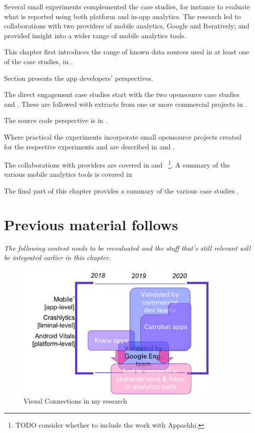Several small experiments complemented the case studies, for instance to evaluate what is reported using both platform and in-app analytics. 
The research led to collaborations with two providers of mobile analytics, Google and Iteratively; and provided insight into a wider range of mobile analytics tools.


This chapter first introduces the range of known data sources used in at least one of the case studies, in . 

Section  presents the app developers' perspectives. 

The direct engagement case studies start with the two opensource case studies  and . These are followed with extracts from one or more commercial projects in . 

The source code perspective is in .

Where practical the experiments incorporate small opensource projects created for the respective experiments and are described in  and . 

The collaborations with providers are covered in  and ~\footnote{TODO consider whether to include the work with Appachhi.}. A summary of the various mobile analytics tools is covered in 

The final part of this chapter provides a summary of the various case studies . 

\hrulefill
\clearpage
\section{Previous material follows}
\textit{The following content needs to be reevaluated and the stuff that's still relevant will be integrated earlier in this chapter.}
\begin{figure}[htbp!]
    \centering
    \includegraphics[width=10cm]{images/visual-connections-in-research.png}
    \caption{Visual Connections in my research}
    \label{fig:visual-connections-in-research}
\end{figure}

